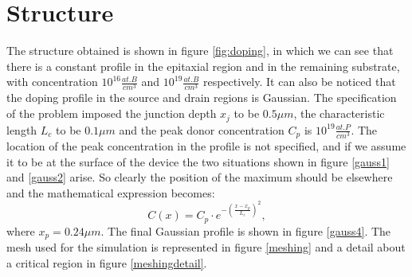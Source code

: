 \documentclass[11pt,a4paper]{article}
\begin{document}
	\section{Structure}
	The structure obtained is shown in figure \ref*{fig:doping}, in which we can see that there is a constant profile in the epitaxial region and in the remaining substrate, with concentration $10^{16} \frac{at.B}{cm^{3}}$ and $10^{19} \frac{at.B}{cm^3}$ respectively. It can also be noticed that the doping profile in the source and drain regions is Gaussian. The specification of the problem imposed the junction depth $x_j$ to be $0.5 \mu m$, the characteristic length $L_{c}$ to be $0.1 \mu m$ and the peak donor concentration $C_p$ is $10^{19} \frac{at.P}{cm^3}$. The location of the peak concentration in the profile is not specified, and if we assume it to be at the surface of the device the two situations shown in figure \ref*{gauss1} and \ref*{gauss2} arise. So clearly the position of the maximum should be elsewhere and the mathematical expression becomes: \[ C(x) = C_p \cdot e^{-(\frac{x-x_p}{L_{c}})^2},\] where $x_p = 0.24 \mu m$. The final Gaussian profile is shown in figure \ref*{gauss4}. 
	The mesh used for the simulation is represented in figure \ref*{meshing} and a detail about a critical region in figure \ref*{meshingdetail}.
	
\end{document}
